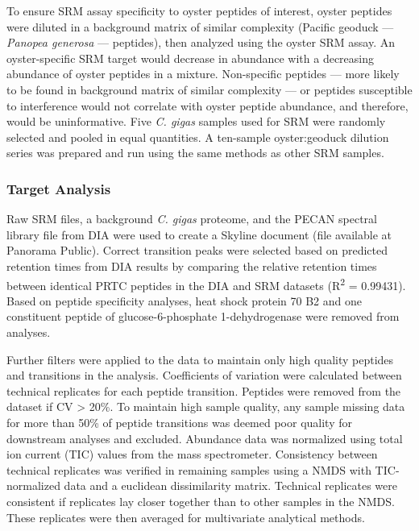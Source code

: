 \documentclass [11pt, proquest] {uwthesis}[2015/03/03]
\begin{document}
To ensure SRM assay specificity to oyster peptides of interest, oyster peptides were diluted in a background matrix of similar complexity (Pacific geoduck --- \emph{Panopea generosa} --- peptides), then analyzed using the oyster SRM assay. An oyster-specific SRM target would decrease in abundance with a decreasing abundance of oyster peptides in a mixture. Non-specific peptides --- more likely to be found in background matrix of similar complexity --- or peptides susceptible to interference would not correlate with oyster peptide abundance, and therefore, would be uninformative. Five \emph{C. gigas} samples used for SRM were randomly selected and pooled in equal quantities. A ten-sample oyster:geoduck dilution series was prepared and run using the same methods as other SRM samples.

\hypertarget{target-analysis}{%
\subsubsection{Target Analysis}\label{target-analysis}}

Raw SRM files, a background \emph{C. gigas} proteome, and the PECAN spectral library file from DIA were used to create a Skyline document (file available at Panorama Public). Correct transition peaks were selected based on predicted retention times from DIA results by comparing the relative retention times between identical PRTC peptides in the DIA and SRM datasets (R\textsuperscript{2} = 0.99431). Based on peptide specificity analyses, heat shock protein 70 B2 and one constituent peptide of
glucose-6-phosphate 1-dehydrogenase were removed from analyses.

Further filters were applied to the data to maintain only high quality peptides and transitions in the analysis. Coefficients of variation were calculated between technical replicates for each peptide transition. Peptides were removed from the dataset if CV \textgreater{} 20\%. To maintain high sample quality, any sample missing data for more than 50\% of peptide transitions was deemed poor quality for downstream analyses and excluded. Abundance data was normalized using total ion current (TIC) values from the mass spectrometer. Consistency between technical replicates was verified in remaining samples using a NMDS with TIC-normalized data and a euclidean dissimilarity matrix. Technical replicates were consistent if replicates lay closer together than to other samples in the NMDS. These replicates were then averaged for multivariate analytical methods.
\end{document}
